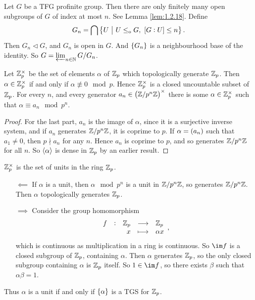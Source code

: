 \begin{example*}
Let $ G $ be a TFG profinite group. Then there are only finitely many open subgroups of $ G $ of index at most $ n $. See Lemma \ref{lem:1.2.18}. Define
$$ G_n = \bigcap \cbr{U \st U \le_\o G, \ \sbr{G : U} \le n}. $$
Then $ G_n \triangleleft G $, and $ G_n $ is open in $ G $. And $ \cbr{G_n} $ is a neighbourhood base of the identity. So $ G = \varprojlim_{n \in \mathbb{N}} G / G_n $.
\end{example*}

\begin{proposition}
\label{prop:2.5.10}
Let $ \mathbb{Z}_p^\times $ be the set of elements $ \alpha $ of $ \mathbb{Z}_p $ which topologically generate $ \mathbb{Z}_p $. Then $ \alpha \in \mathbb{Z}_p^\times $ if and only if $ \alpha \not\equiv 0 \mod p $. Hence $ \mathbb{Z}_p^\times $ is a closed uncountable subset of $ \mathbb{Z}_p $. For every $ n $, and every generator $ a_n \in \br{\ZZ / p^n\ZZ}^\times $ there is some $ \alpha \in \mathbb{Z}_p^\times $ such that $ \alpha \equiv a_n \mod p^n $.
\end{proposition}

\begin{proof}
For the last part, $ a_n $ is the image of $ \alpha $, since it is a surjective inverse system, and if $ a_n $ generates $ \mathbb{Z} / p^n\mathbb{Z} $, it is coprime to $ p $. If $ \alpha = \br{a_n} $ such that $ a_1 \ne 0 $, then $ p \nmid a_n $ for any $ n $. Hence $ a_n $ is coprime to $ p $, and so generates $ \mathbb{Z} / p^n\mathbb{Z} $ for all $ n $. So $ \left\langle \alpha \right\rangle $ is dense in $ \mathbb{Z}_p $ by an earlier result.
\end{proof}


\begin{remark*}
$ \mathbb{Z}_p^\times $ is the set of units in the ring $ \mathbb{Z}_p $.
\begin{itemize}[leftmargin=0.5in]
\item[$ \impliedby $] If $ \alpha $ is a unit, then $ \alpha \mod p^n $ is a unit in $ \mathbb{Z} / p^n\mathbb{Z} $, so generates $ \mathbb{Z} / p^n\mathbb{Z} $. Then $ \alpha $ topologically generates $ \mathbb{Z}_p $.
\item[$ \implies $] Consider the group homomorphism
$$ \function[f]{\ZZ_p}{\ZZ_p}{x}{\alpha x}, $$
which is continuous as multiplication in a ring is continuous. So $ \im f $ is a closed subgroup of $ \mathbb{Z}_p $, containing $ \alpha $. Then $ \alpha $ generates $ \mathbb{Z}_p $, so the only closed subgroup containing $ \alpha $ is $ \mathbb{Z}_p $ itself. So $ 1 \in \im f $, so there exists $ \beta $ such that $ \alpha\beta = 1 $.
\end{itemize}
Thus $ \alpha $ is a unit if and only if $ \cbr{\alpha} $ is a TGS for $ \mathbb{Z}_p $.
\end{remark*}

